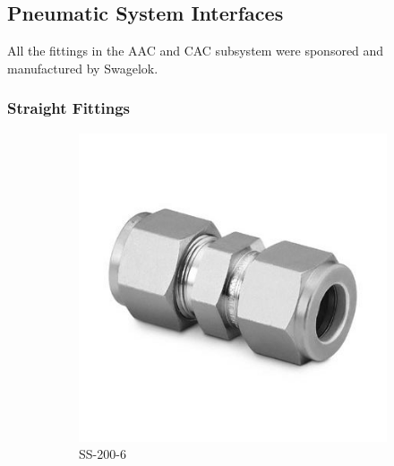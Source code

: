 \subsection{Pneumatic System Interfaces}
\label{sec:appP}
All the fittings in the AAC and CAC subsystem were sponsored and manufactured by Swagelok.
\subsubsection{Straight Fittings}
\begin{figure}[H]
    \centering
    \begin{subfigure}[b]{0.2\textwidth}
    \centering
    \includegraphics[width=\textwidth]{appendix/img/interfaces/SS-200-6.jpg}
    \caption{SS-200-6}
    \end{subfigure}
    ~
    \begin{subfigure}[b]{0.2\textwidth}
    \centering

\end{subfigure}
\end{figure}
